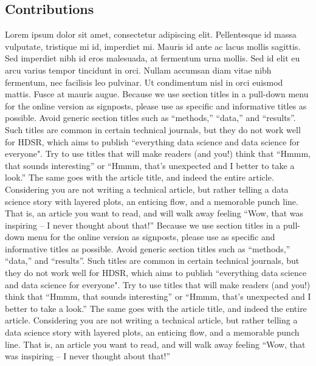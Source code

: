 \documentclass[]{hdsr}
\begin{document}
\subsection*{Contributions}
Lorem ipsum dolor sit amet, consectetur adipiscing elit. Pellentesque id massa vulputate, tristique mi id, imperdiet mi. Mauris id ante ac lacus mollis sagittis. Sed imperdiet nibh id eros malesuada, at fermentum urna mollis. Sed id elit eu arcu varius tempor tincidunt in orci. Nullam accumsan diam vitae nibh fermentum, nec facilisis leo pulvinar. Ut condimentum nisl in orci euismod mattis. Fusce at mauris augue. Because we use section titles in a pull-down menu for the online version as signposts, please use as specific and informative titles as possible. Avoid generic section titles such as ``methods,'' ``data,'' and ``results''. Such titles are common in certain technical journals, but they do not work well for HDSR, which aims to publish ``everything data science and data science for everyone". Try to use titles that will make readers (and you!) think that ``Hmmm, that sounds interesting'' or ``Hmmm, that's unexpected and I better to take a look.''   The same goes with the article title, and indeed the entire article.  Considering you are not writing a technical article, but rather telling a data science story with layered plots, an enticing flow, and a memorable punch line. That is, an article you want to read, and will walk away feeling ``Wow, that was inspiring -- I never thought about that!'' Because we use section titles in a pull-down menu for the online version as signposts, please use as specific and informative titles as possible. Avoid generic section titles such as ``methods,'' ``data,'' and ``results''. Such titles are common in certain technical journals, but they do not work well for HDSR, which aims to publish ``everything data science and data science for everyone". Try to use titles that will make readers (and you!) think that ``Hmmm, that sounds interesting'' or ``Hmmm, that's unexpected and I better to take a look.''   The same goes with the article title, and indeed the entire article.  Considering you are not writing a technical article, but rather telling a data science story with layered plots, an enticing flow, and a memorable punch line. That is, an article you want to read, and will walk away feeling ``Wow, that was inspiring -- I never thought about that!'' 

\appendix
\end{document}
